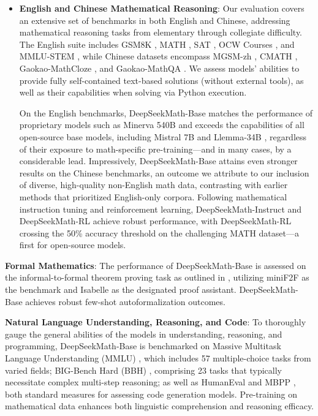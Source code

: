 \begin{itemize}[topsep=0pt]
    \item \textbf{English and Chinese Mathematical Reasoning}: Our evaluation covers an extensive set of benchmarks in both English and Chinese, addressing mathematical reasoning tasks from elementary through collegiate difficulty. The English suite includes GSM8K \citep{gsm8k}, MATH \citep{MATH}, SAT \citep{llemma}, OCW Courses \citep{minerva}, and MMLU-STEM \citep{mmlu}, while Chinese datasets encompass MGSM-zh \citep{mgsm}, CMATH \citep{wei2023cmath}, Gaokao-MathCloze \citep{agieval}, and Gaokao-MathQA \citep{agieval}. We assess models’ abilities to provide fully self-contained text-based solutions (without external tools), as well as their capabilities when solving via Python execution.

    On the English benchmarks, DeepSeekMath-Base matches the performance of proprietary models such as Minerva 540B \citep{minerva} and exceeds the capabilities of all open-source base models, including Mistral 7B \citep{mistral} and Llemma-34B \citep{llemma}, regardless of their exposure to math-specific pre-training—and in many cases, by a considerable lead. Impressively, DeepSeekMath-Base attains even stronger results on the Chinese benchmarks, an outcome we attribute to our inclusion of diverse, high-quality non-English math data, contrasting with earlier methods \citep{minerva,llemma} that prioritized English-only corpora. Following mathematical instruction tuning and reinforcement learning, DeepSeekMath-Instruct and DeepSeekMath-RL achieve robust performance, with DeepSeekMath-RL crossing the 50\% accuracy threshold on the challenging MATH dataset—a first for open-source models.
\end{itemize}

\item \textbf{Formal Mathematics}: The performance of DeepSeekMath-Base is assessed on the informal-to-formal theorem proving task as outlined in \citep{dsp_proof}, utilizing miniF2F \citep{minif2f} as the benchmark and Isabelle \citep{isabelle} as the designated proof assistant. DeepSeekMath-Base achieves robust few-shot autoformalization outcomes.
\item \textbf{Natural Language Understanding, Reasoning, and Code}: To thoroughly gauge the general abilities of the models in understanding, reasoning, and programming, DeepSeekMath-Base is benchmarked on Massive Multitask Language Understanding (MMLU) \citep{mmlu}, which includes 57 multiple-choice tasks from varied fields; BIG-Bench Hard (BBH) \citep{bbh}, comprising 23 tasks that typically necessitate complex multi-step reasoning; as well as HumanEval \citep{codex} and MBPP \citep{mbpp}, both standard measures for assessing code generation models. Pre-training on mathematical data enhances both linguistic comprehension and reasoning efficacy.

